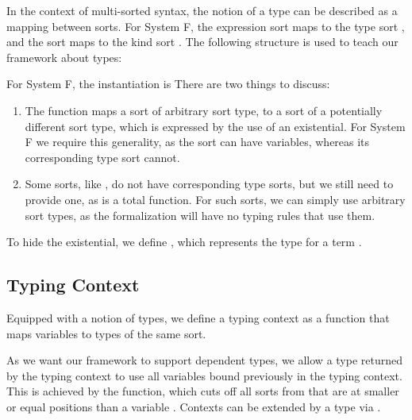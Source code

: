 \documentclass[a4paper, UKenglish, cleveref, autoref, thm-restate]{lipics-v2021}
\newenvironment{LibCode*}{%
  \begin{tcolorbox}[%
    colframe=white,%
    boxrule=0.0pt,%
    top=2.5pt,%
    left=2.5pt,%
    bottom=2.5pt,%
    right=2.5pt,%
    before skip=5pt,%
    after skip=5pt,%
    boxsep=0pt%
  ]
}{%
  \end{tcolorbox}%
}
\newcommand*\LibCode[1]{\begin{LibCode*}{#1}\end{LibCode*}}
\newcommand*\AppCode[1]{{#1}}
\newcommand*\ACode[1]{\AgdaFontStyle{\textcolor{mygray}{#1}}}
\newcommand*\AField[1]{\AgdaField{#1}}
\newcommand*\ACon[1]{\AgdaInductiveConstructor{#1}}
\newcommand*\ADef[1]{\AgdaFunction{#1}}
\begin{document}
  In the context of multi-sorted syntax, the notion of a type can be
  described as a mapping between sorts.
  For System F, the expression sort \ACode{\ACon{𝕖}} maps to the type sort
  \ACode{\ACon{𝕥}}, and the sort \ACode{\ACon{𝕥}} maps to the kind sort
  \ACode{\ACon{𝕜}}.
  The following structure is used to teach our framework about types:
  \LibCode\KTypeSorts
  For System F, the instantiation is
  \AppCode\FTypes
  There are two things to discuss:
  \begin{enumerate}
  \item
    The \ACode{\AField{↑ᵗ}} function maps a sort of arbitrary sort type,
    to a sort of a potentially different sort type, which is expressed
    by the use of an existential.
    For System F we require this generality, as the sort
    \ACode{\ACon{𝕥}} can have variables, whereas its corresponding type
    sort \ACode{\ACon{𝕜}} cannot.
  \item
    Some sorts, like \ACode{\ACon{𝕜}}, do not have corresponding type
    sorts, but we still need to provide one, as \ACode{\AField{↑ᵗ}} is a
    total function.
    For such sorts, we can simply use arbitrary sort types, as the
    formalization will have no typing rules that use them.
  \end{enumerate}
  To hide the existential, we define \ACode{S \ACon{∶⊢} s}, which represents
  the type for a term \ACode{S \ACon{⊢} s}.
  \LibCode\KTypes

  \subsection{Typing Context}
  Equipped with a notion of types, we define a typing context as a
  function that maps variables to types of the same sort.

  As we want our framework to support dependent types, we allow a type returned
  by the typing context to use all variables bound previously in the typing context.
  This is achieved by the \ACode{drop-∈} function, which cuts off all
  sorts from \ACode{S} that are at smaller or equal positions than a variable \ACode{x}.
  Contexts \ACode{Γ} can be extended by a type \ACode{t} via \ACode{t \ADef{∷ᵗ} Γ}.

  \noindent
  \begin{minipage}{1.0\linewidth}
    \begin{minipage}{0.5\linewidth}
      \LibCode\KContexts
      \vspace{3mm}
    \end{minipage}
    \begin{minipage}{0.5\linewidth}
      \LibCode\KContextExt
    \end{minipage}
  \end{minipage}
\end{document}
